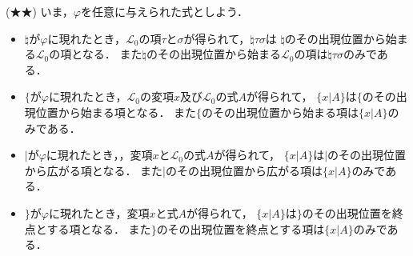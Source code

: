 \documentclass[a4j,10.5pt,oneside,openany]{jsbook}
\theoremstyle{mystyle}
\begin{document}
	\begin{screen}
		(★★) いま，$\varphi$を任意に与えられた式としよう．
		\begin{itemize}
			\item $\natural$が$\varphi$に現れたとき，$\mathcal{L}_{0}$の項$\tau$と$\sigma$が得られて，$\natural \tau \sigma$は
				$\natural$のその出現位置から始まる$\mathcal{L}_{0}$の項となる．
				また$\natural$のその出現位置から始まる$\mathcal{L}_{0}$の項は$\natural \tau \sigma$のみである．
				
			\item $\{$が$\varphi$に現れたとき，$\mathcal{L}_{0}$の変項$x$及び$\mathcal{L}_{0}$の式$A$が得られて，
				$\{ x|A\}$は$\{$のその出現位置から始まる項となる．
				また$\{$のその出現位置から始まる項は$\{x|A\}$のみである．
				
			\item $|$が$\varphi$に現れたとき，，変項$x$と$\mathcal{L}_{0}$の式$A$が得られて，
				$\{x|A\}$は$|$のその出現位置から広がる項となる．
				また$|$のその出現位置から広がる項は$\{x|A\}$のみである．
				
			\item $\}$が$\varphi$に現れたとき，変項$x$と式$A$が得られて，
				$\{x|A\}$は$\}$のその出現位置を終点とする項となる．
				また$\}$のその出現位置を終点とする項は$\{x|A\}$のみである．
		\end{itemize}
	\end{screen}
	
\end{document}
